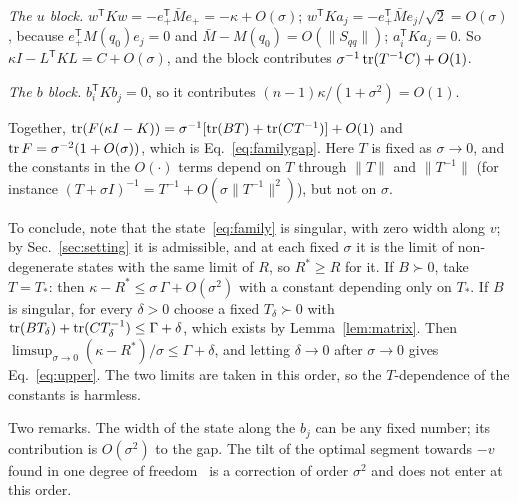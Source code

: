 \emph{The $u$ block.} $w^{\mathsf T}Kw = -e_+^{\mathsf T}\bar Me_+ = -\kappa + O(\sigma)$; $w^{\mathsf T}Ka_j = -e_+^{\mathsf T}\bar Me_j/\sqrt2 = O(\sigma)$, because $e_+^{\mathsf T}M(q_0)e_j = 0$ and $\bar M - M(q_0) = O(\|S_{qq}\|)$; $a_i^{\mathsf T}Ka_j = 0$. So $\kappa I - L^{\mathsf T}KL = C + O(\sigma)$, and the block contributes $\sigma^{-1}\operatorname{tr}(T^{-1}C) + O(1)$.

\emph{The $b$ block.} $b_i^{\mathsf T}Kb_j = 0$, so it contributes $(n-1)\kappa/(1+\sigma^2) = O(1)$.

Together, $\operatorname{tr}(F(\kappa I - K)) = \sigma^{-1}[\operatorname{tr}(BT) + \operatorname{tr}(CT^{-1})] + O(1)$ and $\operatorname{tr} F = \sigma^{-2}(1 + O(\sigma))$, which is Eq.~\eqref{eq:familygap}. Here $T$ is fixed as $\sigma \to 0$, and the constants in the $O(\cdot)$ terms depend on $T$ through $\|T\|$ and $\|T^{-1}\|$ (for instance $(T + \sigma I)^{-1} = T^{-1} + O(\sigma\|T^{-1}\|^2)$), but not on $\sigma$.

To conclude, note that the state~\eqref{eq:family} is singular, with zero width along $v$; by Sec.~\ref{sec:setting} it is admissible, and at each fixed $\sigma$ it is the limit of non-degenerate states with the same limit of $R$, so $R^* \geq R$ for it. If $B \succ 0$, take $T = T_*$: then $\kappa - R^* \leq \sigma\,\Gamma + O(\sigma^2)$ with a constant depending only on $T_*$. If $B$ is singular, for every $\delta > 0$ choose a fixed $T_\delta \succ 0$ with $\operatorname{tr}(BT_\delta) + \operatorname{tr}(CT_\delta^{-1}) \leq \Gamma + \delta$, which exists by Lemma~\ref{lem:matrix}. Then $\limsup_{\sigma\to0}(\kappa - R^*)/\sigma \leq \Gamma + \delta$, and letting $\delta \to 0$ after $\sigma \to 0$ gives Eq.~\eqref{eq:upper}. The two limits are taken in this order, so the $T$-dependence of the constants is harmless.

Two remarks. The width of the state along the $b_j$ can be any fixed number; its contribution is $O(\sigma^2)$ to the gap. The tilt of the optimal segment towards $-v$ found in one degree of freedom~\cite{namba2026gap} is a correction of order $\sigma^2$ and does not enter at this order.

